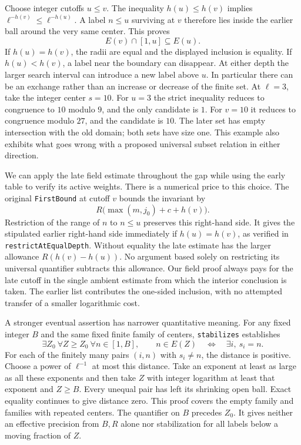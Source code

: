 \documentclass[12pt,letterpaper]{article}
\begin{document}
Choose integer cutoffs $u\le v$. The inequality $h(u)\le h(v)$ implies $\ell^{-h(v)}\le\ell^{-h(u)}$. A label $n\le u$ surviving at $v$ therefore lies inside the earlier ball around the very same center. This proves
\[
             E(v)\cap[1,u]\subseteq E(u).
\]
If $h(u)=h(v)$, the radii are equal and the displayed inclusion is equality. If $h(u)<h(v)$, a label near the boundary can disappear. At either depth the larger search interval can introduce a new label above $u$. In particular there can be an exchange rather than an increase or decrease of the finite set. At $\ell=3$, take the integer center $s=10$. For $u=3$ the strict inequality reduces to congruence to $10$ modulo $9$, and the only candidate is $1$. For $v=10$ it reduces to congruence modulo $27$, and the candidate is $10$. The later set has empty intersection with the old domain; both sets have size one. This example also exhibits what goes wrong with a proposed universal subset relation in either direction.

We can apply the late field estimate throughout the gap while using the early table to verify its active weights. There is a numerical price to this choice. The original \texttt{FirstBound} at cutoff $v$ bounds the invariant by
\[
          R\bigl(\max(m,j_0)+c+h(v)\bigr).
\]
Restriction of the range of $n$ to $n\le u$ preserves this right-hand side. It gives the stipulated earlier right-hand side immediately if $h(u)=h(v)$, as verified in \texttt{restrictAtEqualDepth}. Without equality the late estimate has the larger allowance $R(h(v)-h(u))$. No argument based solely on restricting its universal quantifier subtracts this allowance. Our field proof always pays for the late cutoff in the single ambient estimate from which the interior conclusion is taken. The earlier list contributes the one-sided inclusion, with no attempted transfer of a smaller logarithmic cost.

A stronger eventual assertion has narrower quantitative meaning. For any fixed integer $B$ and the same fixed finite family of centers, \texttt{stabilizes} establishes
\[
   \exists Z_0\ \forall Z\ge Z_0\ \forall n\in[1,B],\qquad
   n\in E(Z)\quad\Longleftrightarrow\quad \exists i,\ s_i=n.
\]
For each of the finitely many pairs $(i,n)$ with $s_i\ne n$, the distance is positive. Choose a power of $\ell^{-1}$ at most this distance. Take an exponent at least as large as all these exponents and then take $Z$ with integer logarithm at least that exponent and $Z\ge B$. Every unequal pair has left its shrinking open ball. Exact equality continues to give distance zero. This proof covers the empty family and families with repeated centers. The quantifier on $B$ precedes $Z_0$. It gives neither an effective precision from $B,R$ alone nor stabilization for all labels below a moving fraction of $Z$.
\end{document}
